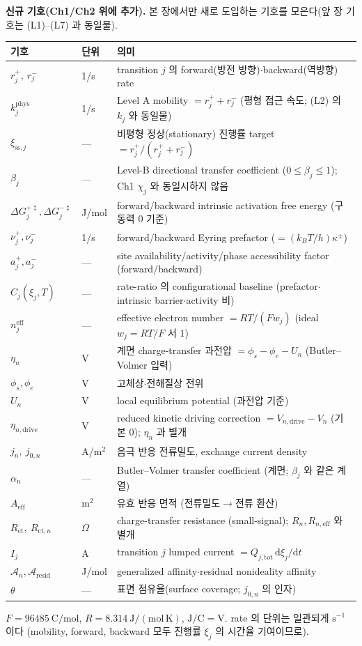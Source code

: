 \documentclass[11pt,a4paper]{article}
\newcommand{\dd}{\mathrm{d}}
\newcommand{\eff}{\mathrm{eff}}
\newcommand{\drive}{\mathrm{drive}}
\newcommand{\tot}{\mathrm{tot}}
\newcommand{\ct}{\mathrm{ct}}
\newcommand{\sstat}{\mathrm{ss}}
\newcommand{\resid}{\mathrm{resid}}
\begin{document}
\textbf{신규 기호(Ch1/Ch2 위에 추가).} 본 장에서만 새로 도입하는 기호를 모은다(앞 장 기호는 (L1)--(L7) 과 동일물).
\begin{longtable}{p{} p{} >{\raggedright\arraybackslash}p{}}
\toprule 기호 & 단위 & 의미 \\ \midrule \endhead
$r_j^+,\ r_j^-$ & 1/s & transition $j$ 의 forward(방전 방향)$\cdot$backward(역방향) rate \\
$k_j^{\mathrm{phys}}$ & 1/s & Level A mobility $=r_j^++r_j^-$ (평형 접근 속도; (L2) 의 $k_j$ 와 동일물) \\
$\xi_{\sstat,j}$ & --- & 비평형 정상(stationary) 진행률 target $=r_j^+/(r_j^++r_j^-)$ \\
$\beta_j$ & --- & Level-B directional transfer coefficient ($0\le\beta_j\le1$); Ch1 $\chi_j$ 와 동일시하지 않음 \\
$\Delta G_j^{+\ddagger},\Delta G_j^{-\ddagger}$ & J/mol & forward/backward intrinsic activation free energy (구동력 $0$ 기준) \\
$\nu_j^+,\nu_j^-$ & 1/s & forward/backward Eyring prefactor ($=(k_BT/h)\kappa^\pm$) \\
$a_j^+,a_j^-$ & --- & site availability/activity/phase accessibility factor (forward/backward) \\
$C_j(\xi_j,T)$ & --- & rate-ratio 의 configurational baseline (prefactor$\cdot$intrinsic barrier$\cdot$activity 비) \\
$n_j^{\eff}$ & --- & effective electron number $=RT/(Fw_j)$ (ideal $w_j=RT/F$ 서 $1$) \\
$\eta_n$ & V & 계면 charge-transfer 과전압 $=\phi_s-\phi_e-U_n$ (Butler--Volmer 입력) \\
$\phi_s,\phi_e$ & V & 고체상$\cdot$전해질상 전위 \\
$U_n$ & V & local equilibrium potential (과전압 기준) \\
$\eta_{n,\drive}$ & V & reduced kinetic driving correction $=V_{n,\drive}-V_n$ (기본 $0$); $\eta_n$ 과 별개 \\
$j_n,\ j_{0,n}$ & A/m$^2$ & 음극 반응 전류밀도, exchange current density \\
$\alpha_n$ & --- & Butler--Volmer transfer coefficient (계면; $\beta_j$ 와 같은 계열) \\
$A_\eff$ & m$^2$ & 유효 반응 면적 (전류밀도$\to$전류 환산) \\
$R_\ct,\ R_{\ct,n}$ & $\Omega$ & charge-transfer resistance (small-signal); $R_n,R_{n,\eff}$ 와 별개 \\
$I_j$ & A & transition $j$ lumped current $=Q_{j,\tot}\,\dd\xi_j/\dd t$ \\
$\mathcal A_n,\mathcal A_{\resid}$ & J/mol & generalized affinity$\cdot$residual nonideality affinity \\
$\theta$ & --- & 표면 점유율(surface coverage; $j_{0,n}$ 의 인자) \\
\bottomrule
\end{longtable}
$F=96485\ \mathrm{C/mol}$, $R=8.314\ \mathrm{J/(mol\,K)}$, $\mathrm{J/C}=\mathrm V$. rate 의 단위는
일관되게 $\mathrm{s^{-1}}$ 이다 (mobility, forward, backward 모두 진행률 $\xi_j$ 의 시간율 기여이므로).
\end{document}
